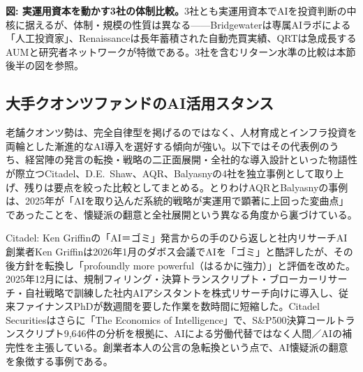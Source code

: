 \begin{center}
\end{center}

\smallskip
{\small\color{figgray}\textbf{図: 実運用資本を動かす3社の体制比較。}}3社とも実運用資本でAIを投資判断の中核に据えるが、体制・規模の性質は異なる——Bridgewaterは専属AIラボによる「人工投資家」、Renaissanceは長年蓄積された自動売買実績、QRTは急成長するAUMと研究者ネットワークが特徴である。3社を含むリターン水準の比較は本節後半の図を参照。

\subsection{大手クオンツファンドのAI活用スタンス}

老舗クオンツ勢は、完全自律型を掲げるのではなく、人材育成とインフラ投資を両輪とした漸進的なAI導入を選好する傾向が強い。以下ではその代表例のうち、経営陣の発言の転換・戦略の二正面展開・全社的な導入設計といった物語性が際立つCitadel、D.E.\ Shaw、AQR、Balyasnyの4社を独立事例として取り上げ、残りは要点を絞った比較としてまとめる。とりわけAQRとBalyasnyの事例は、2025年が「AIを取り込んだ系統的戦略が実運用で顕著に上回った変曲点」であったことを、懐疑派の翻意と全社展開という異なる角度から裏づけている\cite{x03forbes_billionaires2026}。

\begin{casestudy}{Citadel: Ken Griffinの「AI＝ゴミ」発言からの手のひら返しと社内リサーチAI}
創業者Ken Griffinは2026年1月のダボス会議でAIを「ゴミ」と酷評したが、その後方針を転換し「profoundly more powerful（はるかに強力）」と評価を改めた。2025年12月には、規制フィリング・決算トランスクリプト・ブローカーリサーチ・自社戦略で訓練した社内AIアシスタントを株式リサーチ向けに導入し、従来ファイナンスPhDが数週間を要した作業を数時間に短縮した\cite{griffin2026}。Citadel Securitiesはさらに「The Economics of Intelligence」で、S\&P500決算コールトランスクリプト9,646件の分析を根拠に、AIによる労働代替ではなく人間／AIの補完性を主張している\cite{citadelsecurities2026economics}。創業者本人の公言の急転換という点で、AI懐疑派の翻意を象徴する事例である。
\end{casestudy}

